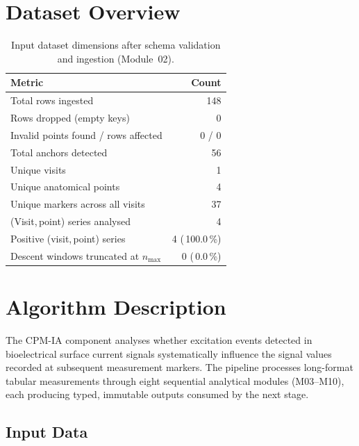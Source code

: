 \documentclass[a4paper,11pt]{article}
\begin{document}
\section{Dataset Overview}

\begin{table}[h!]
\centering
\small
\caption{Input dataset dimensions after schema validation and ingestion (Module~02).}
\begin{tabular}{lr}
\toprule
\textbf{Metric} & \textbf{Count} \\
\midrule
Total rows ingested                        & 148 \\
Rows dropped (empty keys)                  & 0 \\
Invalid points found / rows affected       & 0 / 0 \\
Total anchors detected                     & 56 \\
Unique visits                          & 1 \\
Unique anatomical points               & 4 \\
Unique markers across all visits       & 37 \\
(Visit,\,point) series analysed        & 4 \\
Positive (visit,\,point) series        & 4 (\,100.0\,\%) \\
Descent windows truncated at $n_{\max}$ & 0 (\,0.0\,\%) \\
\bottomrule
\end{tabular}
\end{table}

\section{Algorithm Description}

The CPM-IA component analyses whether excitation events detected in bioelectrical surface
current signals systematically influence the signal values recorded at subsequent measurement
markers. The pipeline processes long-format tabular measurements through eight sequential
analytical modules (M03--M10), each producing typed, immutable outputs consumed by the next
stage.

\subsection{Input Data}
\end{document}

